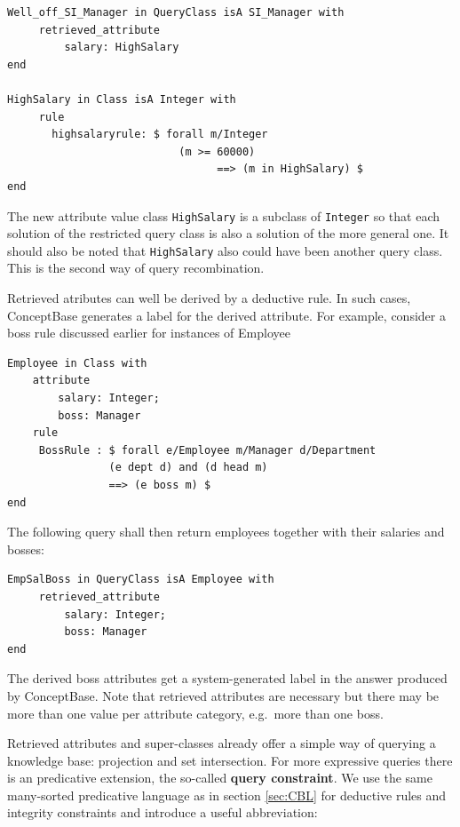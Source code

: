 {\small
\begin{verbatim}
Well_off_SI_Manager in QueryClass isA SI_Manager with
     retrieved_attribute
         salary: HighSalary
end

HighSalary in Class isA Integer with
     rule
       highsalaryrule: $ forall m/Integer
                           (m >= 60000)
                                 ==> (m in HighSalary) $
end

\end{verbatim}
}

The new attribute value class {\tt HighSalary} is a subclass of {\tt Integer} so that
each solution of the restricted query class is also a solution of the more
general one. It should also be noted that {\tt HighSalary} also could have been
another query class. This is the second way of query recombination.

Retrieved atributes can well be derived by a deductive rule. In such cases, ConceptBase
generates a label for the derived attribute. For example, consider a boss rule discussed earlier for
instances of Employee


{\small
\begin{verbatim}
Employee in Class with
    attribute
        salary: Integer;
        boss: Manager
    rule
     BossRule : $ forall e/Employee m/Manager d/Department
                (e dept d) and (d head m)
                ==> (e boss m) $
end
\end{verbatim}
}

The following query shall then return employees together with their salaries and bosses:

{\small
\begin{verbatim}
EmpSalBoss in QueryClass isA Employee with
     retrieved_attribute
         salary: Integer;
         boss: Manager
end
\end{verbatim}
}

The derived boss attributes get a system-generated label in the answer produced by
ConceptBase. Note that retrieved attributes are necessary but there may be more than one value per attribute category,
e.g.\ more than one boss.


Retrieved attributes and super-classes already offer a simple way of
querying a knowledge base: projection and set intersection. For more
expressive queries there is an predicative extension, the so-called {\bf query
constraint}.
We use the same many-sorted predicative language as in section \ref{sec:CBL}
for deductive rules and integrity constraints and introduce  a useful
abbreviation:


